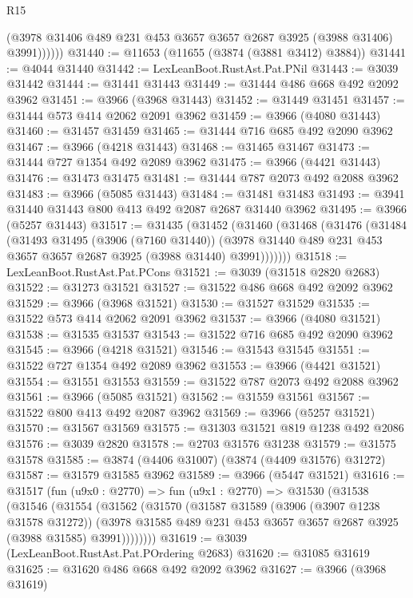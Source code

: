 \begin{lexlean}{R15}
\begin{coremodule}
              (@3978 @31406 @489 @231 @453 @3657 @3657 @2687 @3925 (@3988 @31406) @3991))))))
@31440 := @11653 (@11655 (@3874 (@3881 @3412) @3884))
@31441 := @4044 @31440
@31442 := LexLeanBoot.RustAst.Pat.PNil
@31443 := @3039 @31442
@31444 := @31441 @31443
@31449 := @31444 @486 @668 @492 @2092 @3962
@31451 := @3966 (@3968 @31443)
@31452 := @31449 @31451
@31457 := @31444 @573 @414 @2062 @2091 @3962
@31459 := @3966 (@4080 @31443)
@31460 := @31457 @31459
@31465 := @31444 @716 @685 @492 @2090 @3962
@31467 := @3966 (@4218 @31443)
@31468 := @31465 @31467
@31473 := @31444 @727 @1354 @492 @2089 @3962
@31475 := @3966 (@4421 @31443)
@31476 := @31473 @31475
@31481 := @31444 @787 @2073 @492 @2088 @3962
@31483 := @3966 (@5085 @31443)
@31484 := @31481 @31483
@31493 := @3941 @31440 @31443 @800 @413 @492 @2087 @2687 @31440 @3962
@31495 := @3966 (@5257 @31443)
@31517 := @31435
    (@31452
      (@31460
        (@31468
          (@31476
            (@31484
              (@31493
                @31495
                (@3906 (@7160 @31440))
                (@3978 @31440 @489 @231 @453 @3657 @3657 @2687 @3925 (@3988 @31440) @3991)))))))
@31518 := LexLeanBoot.RustAst.Pat.PCons
@31521 := @3039 (@31518 @2820 @2683)
@31522 := @31273 @31521
@31527 := @31522 @486 @668 @492 @2092 @3962
@31529 := @3966 (@3968 @31521)
@31530 := @31527 @31529
@31535 := @31522 @573 @414 @2062 @2091 @3962
@31537 := @3966 (@4080 @31521)
@31538 := @31535 @31537
@31543 := @31522 @716 @685 @492 @2090 @3962
@31545 := @3966 (@4218 @31521)
@31546 := @31543 @31545
@31551 := @31522 @727 @1354 @492 @2089 @3962
@31553 := @3966 (@4421 @31521)
@31554 := @31551 @31553
@31559 := @31522 @787 @2073 @492 @2088 @3962
@31561 := @3966 (@5085 @31521)
@31562 := @31559 @31561
@31567 := @31522 @800 @413 @492 @2087 @3962
@31569 := @3966 (@5257 @31521)
@31570 := @31567 @31569
@31575 := @31303 @31521 @819 @1238 @492 @2086
@31576 := @3039 @2820
@31578 := @2703 @31576 @31238
@31579 := @31575 @31578
@31585 := @3874 (@4406 @31007) (@3874 (@4409 @31576) @31272)
@31587 := @31579 @31585 @3962
@31589 := @3966 (@5447 @31521)
@31616 := @31517
    (fun (u9x0 : @2770) =>
    fun (u9x1 : @2770) =>
    @31530
      (@31538
        (@31546
          (@31554
            (@31562
              (@31570
                (@31587
                  @31589
                  (@3906 (@3907 @1238 @31578 @31272))
                  (@3978 @31585 @489 @231 @453 @3657 @3657 @2687 @3925 (@3988 @31585) @3991))))))))
@31619 := @3039 (LexLeanBoot.RustAst.Pat.POrdering @2683)
@31620 := @31085 @31619
@31625 := @31620 @486 @668 @492 @2092 @3962
@31627 := @3966 (@3968 @31619)

\end{coremodule}
\end{lexlean}
